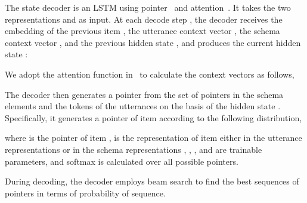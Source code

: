 \documentclass[11pt]{article}
\begin{document}
The state decoder is an LSTM using pointer~\citep{vinyals2015pointer} and attention~\citep{bahdanau2014neural}. It takes the two representations  and  as input.
At each decode step , the decoder receives the embedding of the previous item , the utterance context vector , the schema context vector , and the previous hidden state , and produces the current hidden state :


We adopt the attention function in~\citep{bahdanau2014neural} to calculate the context vectors as follows,


The decoder then generates a pointer from the set of pointers in the schema elements and the tokens of the utterances on the basis of the hidden state .
Specifically, it generates a pointer of item  according to the following distribution,

where  is the pointer of item ,  is the representation of item  either in the utterance representations  or in the schema representations , , , and  are trainable parameters, and softmax is calculated over all possible pointers.

During decoding, the decoder employs beam search to find the best sequences of pointers in terms of probability of sequence.


\begin{table*}[h]
\centering
{}
\caption{Statistics of datasets in experiments. Numbers are those of training datasets.}
\label{tab:datasets}
\end{table*}
\end{document}
